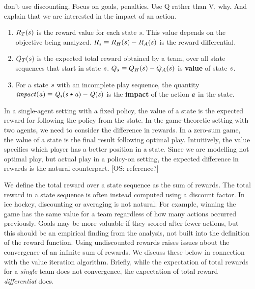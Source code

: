 \documentclass[]{article}
\begin{document}
don't use discounting. Focus on goals, penalties. Use Q rather than V, why. And explain that we are interested in the impact of an action.

\begin{enumerate}
\item $R_{T}(s)$ is the reward value for each state $s$. This value depends on the objective being analyzed. $R_{s} \equiv R_{H}(s)- R_{A}(s)$ is the reward differential.
\item $Q_{T}(s)$ is the expected total reward obtained by a team, over all state sequences that start in state $s$. $Q_{s} \equiv Q_{H}(s)- Q_{A}(s)$ is \textbf{value} of state $s$.
\item For a state $s$ with an incomplete play sequence, the quantity $\it{impact}(a) \equiv Q_{s}(s \star a) - Q(s)$ is the \textbf{impact} of the action $a$ in the state.
\end{enumerate}

In a single-agent setting with a fixed policy, the value of a state is the expected reward for following the policy from the state. In the game-theoretic setting with two agents, we need to consider the difference in rewards.
In a zero-sum game, the value of a state is the final result following optimal play. Intuitively, the value specifies which player has a better position in a state. Since we are modelling not optimal play, but actual play in a policy-on setting, the expected difference in rewards is the natural counterpart. [OS: reference?]

We define the total reward over a state sequence as the sum of rewards. The total reward in a state sequence is often instead computed using a discount factor. In ice hockey, discounting or averaging is not natural. For example, winning the game has the same value for a team regardless of how many actions occurred previously. Goals may be more valuable if they scored after fewer actions, but this should be an empirical finding from the analysis, not built into the definition of the reward function. Using undiscounted rewards raises issues about the convergence of an infinite sum of rewards. We discuss these below in connection with the value iteration algorithm. Briefly, while the expectation of total rewards for a  {\em single} team does not convergence, the expectation of total reward {\em differential} does.
\end{document}
